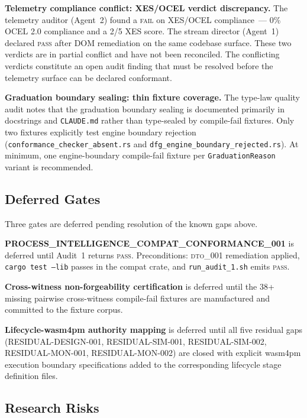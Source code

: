 \textbf{Telemetry compliance conflict: XES/OCEL verdict discrepancy.} The
telemetry auditor (Agent~2) found a \textsc{fail} on XES/OCEL compliance~--- 0\%
OCEL 2.0 compliance and a 2/5 XES score. The stream director (Agent~1) declared
\textsc{pass} after DOM remediation on the same codebase surface. These two
verdicts are in partial conflict and have not been reconciled. The conflicting
verdicts constitute an open audit finding that must be resolved before the
telemetry surface can be declared conformant.

\textbf{Graduation boundary sealing: thin fixture coverage.} The type-law quality
audit notes that the graduation boundary sealing is documented primarily in
docstrings and \texttt{CLAUDE.md} rather than type-sealed by compile-fail
fixtures. Only two fixtures explicitly test engine boundary rejection
(\texttt{conformance\_checker\_absent.rs} and
\texttt{dfg\_engine\_boundary\_rejected.rs}). At minimum, one engine-boundary
compile-fail fixture per \texttt{GraduationReason} variant is recommended.

\subsection{Deferred Gates}
\label{sec:audits-open-deferred}

Three gates are deferred pending resolution of the known gaps above.

\textbf{PROCESS\_INTELLIGENCE\_COMPAT\_CONFORMANCE\_001} is deferred until
Audit~1 returns \textsc{pass}. Preconditions: \textsc{dto\_001} remediation
applied, \texttt{cargo test --lib} passes in the compat crate, and
\texttt{run\_audit\_1.sh} emits \textsc{pass}.

\textbf{Cross-witness non-forgeability certification} is deferred until the
38+ missing pairwise cross-witness compile-fail fixtures are manufactured and
committed to the fixture corpus.

\textbf{Lifecycle-wasm4pm authority mapping} is deferred until all five residual
gaps (RESIDUAL-DESIGN-001, RESIDUAL-SIM-001, RESIDUAL-SIM-002, RESIDUAL-MON-001,
RESIDUAL-MON-002) are closed with explicit wasm4pm execution boundary
specifications added to the corresponding lifecycle stage definition files.

\subsection{Research Risks}
\label{sec:audits-open-risks}

